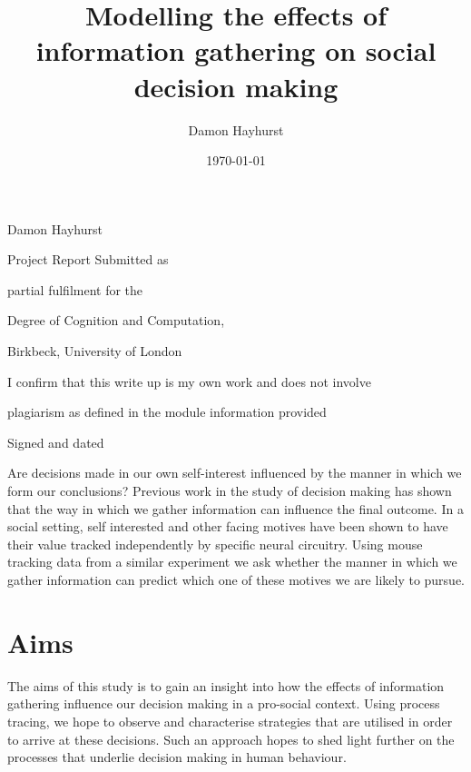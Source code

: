 \documentclass[man, floatsintext]{apa7}
\title{Modelling the effects of information gathering on social decision making}
\author{Damon Hayhurst}
\date{\today}
\makeatletter
\renewcommand{\maketitle}{
	\begin{titlepage}
		\centering
		\vspace*{0.4in}
		{\Huge \bfseries \@title \par}
		\vspace{0.2in}
		{\LARGE Damon Hayhurst \par}
		\vspace{0.3in}
		{\Large Project Report Submitted as\par}
		{\Large partial fulfilment for the\par}
		{\Large Degree of Cognition and Computation,\par}
		\vfill
		{\Large Birkbeck, University of London\par}
		{\Large \@date \par}
		\vfill
		{\Large
			\begin{center}
				I confirm that this write up is my own work and does not involve\par
				plagiarism as defined in the module information provided
			\end{center}
		}
		{\Large Signed and dated\par}
		\vspace{1in}
	\end{titlepage}
}
\makeatother
\begin{document}
\maketitle


\abstract







Are decisions made in our own self-interest influenced by the manner in which we form our conclusions? Previous work in the study of decision making has shown that the way in which we gather information can influence the final outcome. In a social setting, self interested and other facing motives have been shown to have their value tracked independently by specific neural circuitry. Using mouse tracking data from a similar experiment we ask whether the manner in which we gather information can predict which one of these motives we are likely to pursue. 

\section{Aims}

The aims of this study is to gain an insight into how the effects of information gathering influence our decision making in a pro-social context.  Using process tracing, we hope to observe and characterise strategies that are utilised in order to arrive at these decisions. Such an approach hopes to shed light further on the processes that underlie decision making in human behaviour.
\end{document}
